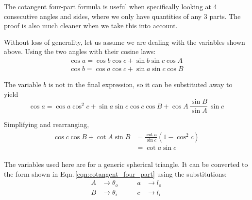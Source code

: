 The cotangent four-part formula is useful when specifically looking at 4 consecutive angles and sides, where we only have quantities of any 3 parts. The proof is also much cleaner when we take this into account.
\begin{figure}[h]
    \centering
\end{figure}

Without loss of generality, let us assume we are dealing with the variables shown above. Using the two angles with their cosine laws:
\begin{gather}
    \cos a = \cos b \cos c + \sin b \sin c \cos A \\
    \cos b = \cos a \cos c + \sin a \sin c \cos B
\end{gather}

The variable $b$ is not in the final expression, so it can be substituted away to yield
\begin{equation}
    \cos a = \cos a \cos^2 c + \sin a \sin c \cos c \cos B + \cos A \,\frac{\sin B}{\sin A}\, \sin c 
\end{equation}

Simplifying and rearranging,
\begin{align}
\begin{split}
    \cos c \cos B + \cot A \sin B &= \frac{\cot a}{\sin c} \left( 1 - \cos^2 c \right) \\
    &= \cot a \sin c
\end{split}
\end{align}

The variables used here are for a generic spherical triangle. It can be converted to the form shown in Eqn.\,\ref{eqn:cotangent_four_part} using the substitutions:
\begin{equation*}
    \begin{split}
        A &\rightarrow \theta_o \\ 
        B &\rightarrow \theta_i
    \end{split}
    \qquad
    \begin{split}
        a &\rightarrow l_o \\
        c &\rightarrow l_i
    \end{split}
\end{equation*}

